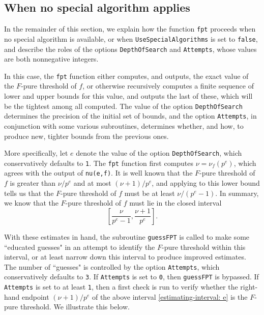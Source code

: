 \documentclass{amsart}
\begin{document}
\subsection{When no special algorithm applies}

In the remainder of this section, we explain how the function  \texttt{fpt} proceeds when no special algorithm is available, or when \texttt{UseSpecialAlgorithms} is set to \texttt{false}, and describe the roles of the options \texttt{DepthOfSearch} and \texttt{Attempts}, whose values are both nonnegative integers.

In this case, the \texttt{fpt} function either computes, and outputs, the exact value of the $F$-pure threshold of $f$, or otherwise recursively computes a finite sequence of lower and upper bounds for this value, and outputs the last of these, which will be the tightest among all computed.  The value of the option \texttt{DepthOfSearch} determines the precision of the initial set of bounds, and the option \texttt{Attempts}, in conjunction with some various subroutines, determines whether, and how, to produce new, tighter bounds from the previous ones.


More specifically, let $e$ denote the value of the option \texttt{DepthOfSearch}, which conservatively defaults to \texttt{1}.  The \texttt{fpt} function first computes $\nu=\nu_f(p^e)$, which agrees with the output of \texttt{nu(e,f)}.  It is well known that the $F$-pure threshold of $f$ is greater than $\nu/p^e$ and at most $(\nu+1)/p^e$, and applying  \cite[Proposition 4.2]{HernandezFPurityOfHypersurfaces} to this lower bound tells us that the $F$-pure threshold of $f$ must be at least $\nu/(p^e-1)$.  In summary, we know that the $F$-pure threshold of $f$ must lie in the closed interval
%
\begin{equation}
\label{estimating-interval: e}
\tag{$\dagger$}
\left[ \frac{\nu}{p^e-1}, \frac{\nu+1}{p^e} \right].
\end{equation}

With these estimates in hand, the subroutine \texttt{guessFPT} is called to make some ``educated guesses" in an attempt to identify the $F$-pure threshold within this interval, or at least narrow down this interval to produce improved estimates.  The number of ``guesses" is controlled by the option \texttt{Attempts}, which conservatively defaults to \texttt{3}.  If \texttt{Attempts} is set to \texttt{0}, then \texttt{guessFPT} is bypassed. If  \texttt{Attempts} is set to at least \texttt{1}, then a first check is run to verify whether the right-hand endpoint $(\nu+1)/p^e$ of the above interval \eqref{estimating-interval: e} is the $F$-pure threshold.  We illustrate this below.
\end{document}
